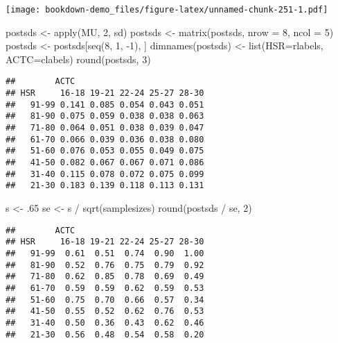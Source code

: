 \documentclass[
]{book}
\newenvironment{Shaded}{\begin{snugshade}}{\end{snugshade}}
\newcommand{\AttributeTok}[1]{\textcolor[rgb]{0.77,0.63,0.00}{#1}}
\newcommand{\DecValTok}[1]{\textcolor[rgb]{0.00,0.00,0.81}{#1}}
\newcommand{\FunctionTok}[1]{\textcolor[rgb]{0.00,0.00,0.00}{#1}}
\newcommand{\NormalTok}[1]{#1}
\newcommand{\OtherTok}[1]{\textcolor[rgb]{0.56,0.35,0.01}{#1}}
\newcommand{\SpecialCharTok}[1]{\textcolor[rgb]{0.00,0.00,0.00}{#1}}
\begin{document}
\texttt{[image: bookdown-demo\_files/figure-latex/unnamed-chunk-251-1.pdf]}

\begin{Shaded}
\begin{Highlighting}[]
\NormalTok{postsds }\OtherTok{\textless{}{-}} \FunctionTok{apply}\NormalTok{(MU, }\DecValTok{2}\NormalTok{, sd)}
\NormalTok{postsds }\OtherTok{\textless{}{-}} \FunctionTok{matrix}\NormalTok{(postsds, }\AttributeTok{nrow =} \DecValTok{8}\NormalTok{, }\AttributeTok{ncol =} \DecValTok{5}\NormalTok{)}
\NormalTok{postsds }\OtherTok{\textless{}{-}}\NormalTok{ postsds[}\FunctionTok{seq}\NormalTok{(}\DecValTok{8}\NormalTok{, }\DecValTok{1}\NormalTok{, }\SpecialCharTok{{-}}\DecValTok{1}\NormalTok{), ]}
\FunctionTok{dimnames}\NormalTok{(postsds) }\OtherTok{\textless{}{-}} \FunctionTok{list}\NormalTok{(}\AttributeTok{HSR=}\NormalTok{rlabels,}
                          \AttributeTok{ACTC=}\NormalTok{clabels)}
\FunctionTok{round}\NormalTok{(postsds, }\DecValTok{3}\NormalTok{)}
\end{Highlighting}
\end{Shaded}

\begin{verbatim}
##        ACTC
## HSR     16-18 19-21 22-24 25-27 28-30
##   91-99 0.141 0.085 0.054 0.043 0.051
##   81-90 0.075 0.059 0.038 0.038 0.063
##   71-80 0.064 0.051 0.038 0.039 0.047
##   61-70 0.066 0.039 0.036 0.038 0.080
##   51-60 0.076 0.053 0.055 0.049 0.075
##   41-50 0.082 0.067 0.067 0.071 0.086
##   31-40 0.115 0.078 0.072 0.075 0.099
##   21-30 0.183 0.139 0.118 0.113 0.131
\end{verbatim}

\begin{Shaded}
\begin{Highlighting}[]
\NormalTok{s }\OtherTok{\textless{}{-}}\NormalTok{ .}\DecValTok{65}
\NormalTok{se }\OtherTok{\textless{}{-}}\NormalTok{ s }\SpecialCharTok{/} \FunctionTok{sqrt}\NormalTok{(samplesizes)}
\FunctionTok{round}\NormalTok{(postsds }\SpecialCharTok{/}\NormalTok{ se, }\DecValTok{2}\NormalTok{)}
\end{Highlighting}
\end{Shaded}

\begin{verbatim}
##        ACTC
## HSR     16-18 19-21 22-24 25-27 28-30
##   91-99  0.61  0.51  0.74  0.90  1.00
##   81-90  0.52  0.76  0.75  0.79  0.92
##   71-80  0.62  0.85  0.78  0.69  0.49
##   61-70  0.59  0.59  0.62  0.59  0.53
##   51-60  0.75  0.70  0.66  0.57  0.34
##   41-50  0.55  0.52  0.62  0.76  0.53
##   31-40  0.50  0.36  0.43  0.62  0.46
##   21-30  0.56  0.48  0.54  0.58  0.20
\end{verbatim}
\end{document}
